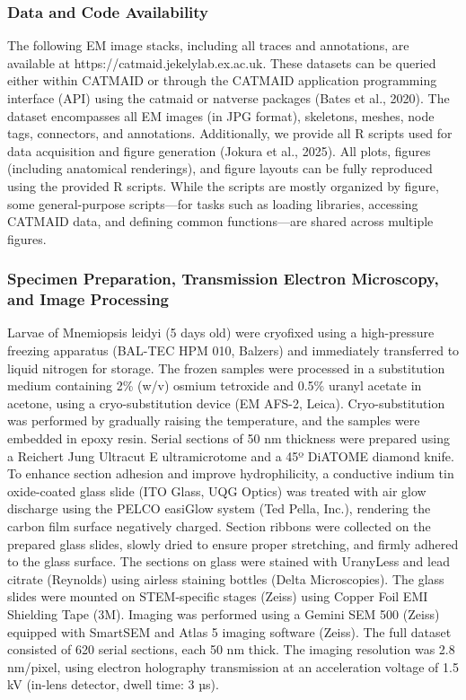 \documentclass[
  11pt,
]{article}
\begin{document}
\subsubsection{Data and Code
Availability}\label{data-and-code-availability}

The following EM image stacks, including all traces and annotations, are
available at https://catmaid.jekelylab.ex.ac.uk. These datasets can be
queried either within CATMAID or through the CATMAID application
programming interface (API) using the catmaid or natverse packages
(Bates et al., 2020). The dataset encompasses all EM images (in JPG
format), skeletons, meshes, node tags, connectors, and annotations.
Additionally, we provide all R scripts used for data acquisition and
figure generation (Jokura et al., 2025). All plots, figures (including
anatomical renderings), and figure layouts can be fully reproduced using
the provided R scripts. While the scripts are mostly organized by
figure, some general-purpose scripts---for tasks such as loading
libraries, accessing CATMAID data, and defining common functions---are
shared across multiple figures.

\subsubsection{Specimen Preparation, Transmission Electron Microscopy,
and Image
Processing}\label{specimen-preparation-transmission-electron-microscopy-and-image-processing}

Larvae of Mnemiopsis leidyi (5 days old) were cryofixed using a
high-pressure freezing apparatus (BAL-TEC HPM 010, Balzers) and
immediately transferred to liquid nitrogen for storage. The frozen
samples were processed in a substitution medium containing 2\% (w/v)
osmium tetroxide and 0.5\% uranyl acetate in acetone, using a
cryo-substitution device (EM AFS-2, Leica). Cryo-substitution was
performed by gradually raising the temperature, and the samples were
embedded in epoxy resin. Serial sections of 50 nm thickness were
prepared using a Reichert Jung Ultracut E ultramicrotome and a 45º
DiATOME diamond knife. To enhance section adhesion and improve
hydrophilicity, a conductive indium tin oxide-coated glass slide (ITO
Glass, UQG Optics) was treated with air glow discharge using the PELCO
easiGlow system (Ted Pella, Inc.), rendering the carbon film surface
negatively charged. Section ribbons were collected on the prepared glass
slides, slowly dried to ensure proper stretching, and firmly adhered to
the glass surface. The sections on glass were stained with UranyLess and
lead citrate (Reynolds) using airless staining bottles (Delta
Microscopies). The glass slides were mounted on STEM-specific stages
(Zeiss) using Copper Foil EMI Shielding Tape (3M). Imaging was performed
using a Gemini SEM 500 (Zeiss) equipped with SmartSEM and Atlas 5
imaging software (Zeiss). The full dataset consisted of 620 serial
sections, each 50 nm thick. The imaging resolution was 2.8 nm/pixel,
using electron holography transmission at an acceleration voltage of 1.5
kV (in-lens detector, dwell time: 3 µs).
\end{document}
